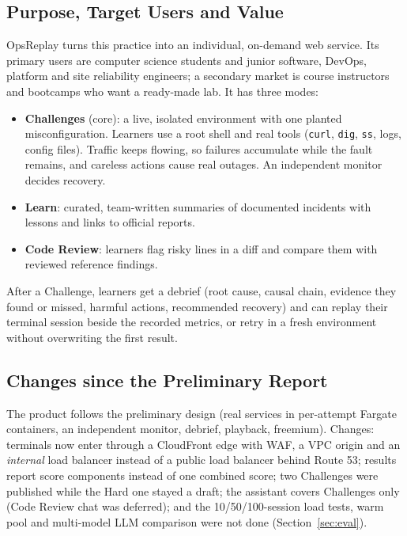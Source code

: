 \documentclass[11pt,a4paper]{article}
\begin{document}
\subsection{Purpose, Target Users and Value}
OpsReplay turns this practice into an individual, on-demand web service.
Its primary users are computer science students and junior software, DevOps,
platform and site reliability engineers; a secondary market is course
instructors and bootcamps who want a ready-made lab. It has three modes:
\begin{itemize}
  \item \textbf{Challenges} (core): a live, isolated environment with one planted
  misconfiguration. Learners use a root shell and real tools (\texttt{curl},
  \texttt{dig}, \texttt{ss}, logs, config files). Traffic keeps flowing, so
  failures accumulate while the fault remains, and careless actions cause real
  outages. An independent monitor decides recovery.
  \item \textbf{Learn}: curated, team-written summaries of documented incidents
  with lessons and links to official reports.
  \item \textbf{Code Review}: learners flag risky lines in a diff and compare
  them with reviewed reference findings.
\end{itemize}
After a Challenge, learners get a debrief (root cause, causal chain, evidence
they found or missed, harmful actions, recommended recovery) and can replay
their terminal session beside the recorded metrics, or retry in a fresh
environment without overwriting the first result.

\subsection{Changes since the Preliminary Report}
The product follows the preliminary design (real services in per-attempt
Fargate containers, an independent monitor, debrief, playback, freemium).
Changes: terminals now enter through a CloudFront edge with WAF, a VPC origin
and an \emph{internal} load balancer instead of a public load balancer behind
Route 53; results report score components instead of one combined score; two
Challenges were published while the Hard one stayed a draft; the assistant
covers Challenges only (Code Review chat was deferred); and the 10/50/100-session
load tests, warm pool and multi-model LLM comparison were not done
(Section~\ref{sec:eval}).
\end{document}
